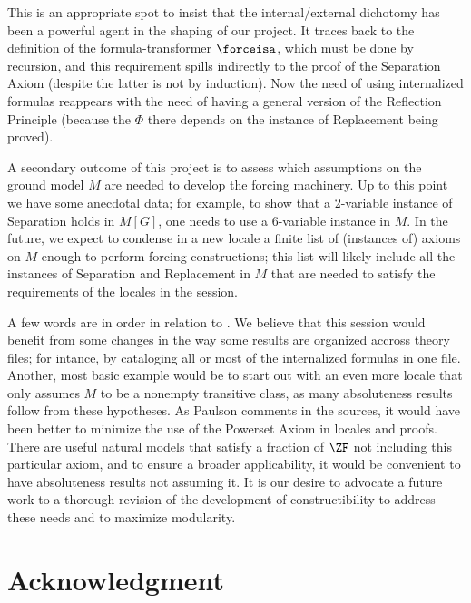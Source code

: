 This is an appropriate spot to insist that the internal/external
dichotomy has been a powerful agent in the shaping of our project. It
traces back to the definition of the formula-transformer $\forceisa$,
which must be done by recursion, and this requirement spills
indirectly to the proof of the Separation Axiom (despite the latter is
not by induction). Now the need of using internalized formulas
reappears with the need of having a general version of the Reflection
Principle (because the $\Phi$ there depends on the instance of
Replacement being proved).

A secondary outcome of this project is to assess which assumptions on
the ground model $M$ are needed to develop the forcing machinery. Up
to this point we have some anecdotal data; for example, to show that a
2-variable instance of Separation holds in $M[G]$, one needs to use a
6-variable instance in $M$. In the future, we expect to condense in a
new locale a finite list of (instances of) axioms on $M$ enough to
perform forcing constructions; this list will likely include all the
instances of Separation and Replacement in $M$ that are needed to
satisfy the requirements of the locales in the
 session.

A few words are in order in relation to .
We believe that this  session  would benefit from some changes in
the way some results are organized accross theory files; for
intance, by cataloging all or most of the internalized formulas in one
file. Another, most basic example would be to start out with an even
more locale that only assumes $M$ to be a nonempty transitive class,
as many absoluteness results follow from these hypotheses.
As Paulson comments in the sources, it would have been better to
minimize the use of the Powerset Axiom in locales and proofs. There
are  useful natural models that satisfy a fraction of $\ZF$ not including
this particular axiom, and to ensure a broader applicability, it would
be convenient to have  absoluteness results not assuming it.
It is our desire to advocate a future work to a thorough
revision of the development of constructibility to address these needs
and to maximize modularity.


\section*{Acknowledgment}


